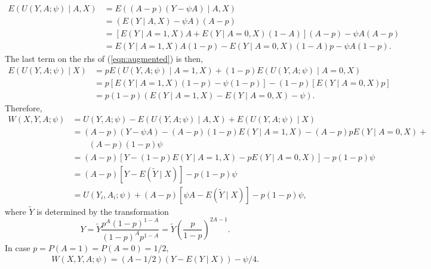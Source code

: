 \documentclass[10pt,a4paper]{amsart}
\newcommand{\EE}{E}
\newcommand{\PP}{P}
\begin{document}
\begin{align*}
  \EE(U(Y,A;\psi)\mid A,X) &= \EE((A-p)(Y-\psi A)\mid A,X)\\
                           &= (\EE(Y\mid A,X)-\psi A)(A-p)\\
                           &=[\EE(Y\mid A=1,X)A + \EE(Y\mid A=0,X)(1-A)](A-p) - \psi A(A-p)\\
                           &= \EE(Y\mid A=1,X)A(1-p) - \EE(Y\mid A=0,X)(1-A)p - \psi A(1-p).
\end{align*}
The last term on the rhs of (\ref{eqn:augmented}) is then,
\begin{align*}
  \EE(U(Y,A;\psi)\mid X) &= p  \EE(U(Y,A;\psi)\mid A=1,X) + (1-p)  \EE(U(Y,A;\psi)\mid A=0,X)\\
                         &= p[\EE(Y\mid A=1,X)(1-p) - \psi (1-p)] - (1-p)[\EE(Y\mid A=0,X)p]\\
                         &= p(1-p)(\EE(Y\mid A=1,X) - \EE(Y\mid A=0,X) - \psi).
\end{align*}
Therefore,
\begin{align*}
  W(X,Y,A;\psi) &= U(Y,A;\psi) - \EE(U(Y,A;\psi)\mid A,X) + \EE(U(Y,A;\psi)\mid X)\\
                &= (A-p)(Y-\psi A) - (A-p)(1-p)\EE(Y\mid A=1,X) - (A-p) p\EE(Y\mid A=0,X) + \\
                &\qquad (A-p)(1-p)\psi\\
                &= (A-p)[Y - (1-p)\EE(Y\mid A=1,X) - p\EE(Y\mid A=0,X)] - p(1-p)\psi\\
                &= (A-p)[Y - \EE(\tilde{Y}\mid X)] - p(1-p)\psi\\
                &= U(Y_i,A_i;\psi) + (A-p)[\psi A - \EE(\tilde{Y}\mid X)] - p(1-p)\psi,
\end{align*}
where $\tilde{Y}$ is determined by the transformation
\[
  Y = \tilde{Y}\frac{p^A(1-p)^{1-A}}{(1-p)^Ap^{1-A}}=\tilde{Y}\left(\frac{p}{1-p}\right)^{2A-1}.
\]
In case $p=\PP(A=1)=\PP(A=0)=1/2,$
\begin{align}
  W(X,Y,A;\psi) = (A-1/2)(Y-\EE(Y\mid X)) - \psi/4.\label{eqn:W_basic}
\end{align}
\end{document}
